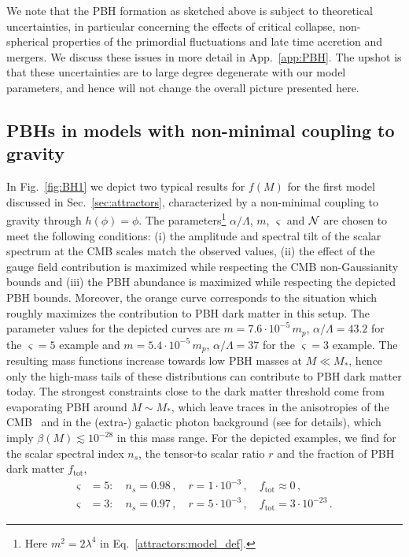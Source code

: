 We note that the PBH formation as sketched above is subject to theoretical uncertainties, in particular concerning the effects of critical collapse, non-spherical properties of the primordial fluctuations and late time accretion and mergers. We discuss these issues in more detail in App.~\ref{app:PBH}. The upshot is that these uncertainties are to large degree degenerate with our model parameters, and hence will not change the overall picture presented here.


\subsection{PBHs in models with non-minimal coupling to gravity}



In Fig.~\ref{fig:BH1} we depict two typical results for $f(M)$ for the first model discussed in Sec.~\ref{sec:attractors}, characterized by a non-minimal coupling to gravity through $h(\phi) = \phi$. The parameters\footnote{Here $m^2 = 2 \lambda^4$ in Eq.~\eqref{attractors:model_def}.}  $\alpha/\Lambda$, $m$, $\varsigma$ and ${\cal N}$ are chosen to meet the following conditions: (i) the amplitude and spectral tilt of the scalar spectrum at the CMB scales match the observed values, (ii) the effect of the gauge field contribution is maximized while respecting the CMB non-Gaussianity bounds and (iii) the PBH abundance is maximized while respecting the depicted PBH bounds. Moreover, the orange curve corresponds to the situation which roughly maximizes the contribution to PBH dark matter in this setup. The parameter values for the depicted curves are $m = 7.6 \cdot 10^{-5}\, m_p$, $\alpha/\Lambda = 43.2$ for the $\varsigma = 5$ example and $m = 5.4 \cdot 10^{-5}\, m_p$, $\alpha/\Lambda = 37$ for the $\varsigma = 3$ example. The resulting mass functions increase towards low PBH masses at $M \ll M_*$, hence only the high-mass tails of these distributions can contribute to PBH dark matter today. The strongest constraints close to the dark matter threshold come from evaporating PBH around $M \sim M_*$, which leave traces in the anisotropies of the CMB~ and in the (extra-) galactic photon background (see \cite{Carr:2009jm} for details), which imply $\beta(M) \lesssim 10^{-28}$ in this mass range. For the depicted examples, we find for the scalar spectral index $n_s$, the tensor-to scalar ratio $r$ and the fraction of PBH dark matter $f_\text{tot}$,
\begin{align}
\varsigma &= 5: \quad n_s = 0.98 \,, \quad r = 1 \cdot 10^{-3} \,, \quad f_\text{tot} \approx 0  \,,\\
\varsigma &= 3: \quad n_s = 0.97 \,, \quad r = 5 \cdot 10^{-3} \,, \quad f_\text{tot} = 3 \cdot 10^{-23} \,.
\end{align}


